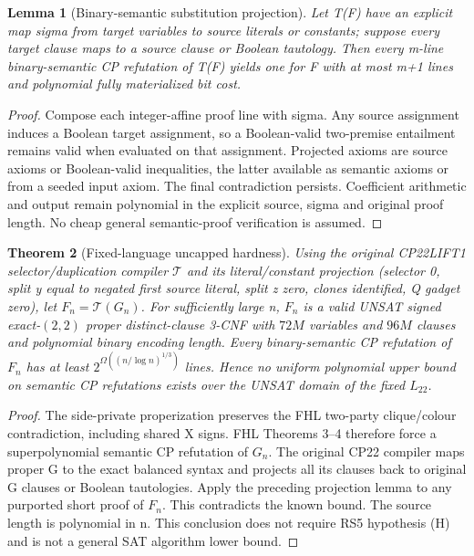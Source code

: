 \documentclass[11pt]{article}
\newtheorem{theorem}{Theorem}
\newtheorem{lemma}[theorem]{Lemma}
\begin{document}
\begin{lemma}[Binary-semantic substitution projection]
Let T(F) have an explicit map sigma from target variables to source literals or constants; suppose every target clause maps to a source clause or Boolean tautology. Then every m-line binary-semantic CP refutation of T(F) yields one for F with at most m+1 lines and polynomial fully materialized bit cost.
\end{lemma}
\begin{proof}
Compose each integer-affine proof line with sigma. Any source assignment induces a Boolean target assignment, so a Boolean-valid two-premise entailment remains valid when evaluated on that assignment. Projected axioms are source axioms or Boolean-valid inequalities, the latter available as semantic axioms or from a seeded input axiom. The final contradiction persists. Coefficient arithmetic and output remain polynomial in the explicit source, sigma and original proof length. No cheap general semantic-proof verification is assumed.
\end{proof}

\begin{theorem}[Fixed-language uncapped hardness]
Using the original CP22LIFT1 selector/duplication compiler $\mathcal T$ and its literal/constant projection (selector 0, split y equal to negated first source literal, split z zero, clones identified, Q gadget zero), let $F_n=\mathcal T(G_n)$. For sufficiently large n, $F_n$ is a valid UNSAT signed exact-$(2,2)$ proper distinct-clause 3-CNF with $72M$ variables and $96M$ clauses and polynomial binary encoding length. Every binary-semantic CP refutation of $F_n$ has at least $2^{\Omega((n/\log n)^{1/3})}$ lines. Hence no uniform polynomial upper bound on semantic CP refutations exists over the UNSAT domain of the fixed $L_{22}$.
\end{theorem}
\begin{proof}
The side-private properization preserves the FHL two-party clique/colour contradiction, including shared X signs. FHL Theorems 3--4 therefore force a superpolynomial semantic CP refutation of $G_n$. The original CP22 compiler maps proper G to the exact balanced syntax and projects all its clauses back to original G clauses or Boolean tautologies. Apply the preceding projection lemma to any purported short proof of $F_n$. This contradicts the known bound. The source length is polynomial in n. This conclusion does not require RS5 hypothesis (H) and is not a general SAT algorithm lower bound.
\end{proof}
\end{document}
